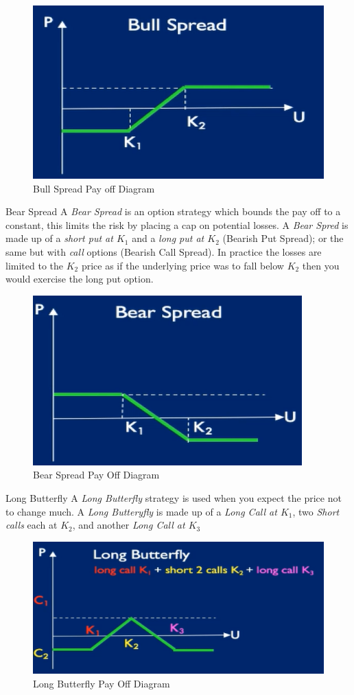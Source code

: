 \documentclass[11pt,a4paper]{article}
\begin{document}
  \begin{figure}[ht!]
    \centering
    \includegraphics[width=.5\textwidth]{bullSpread.PNG}
    \caption{Bull Spread Pay off Diagram}
  \end{figure}

  \begin{definition}{Bear Spread}
    A \textit{Bear Spread} is an option strategy which bounds the pay off to a constant, this limits the risk by placing a cap on potential losses. A \textit{Bear Spred} is made up of a \textit{short put at $K_1$} and a \textit{long put at $K_2$} (Bearish Put Spread); or the same but with \textit{call} options (Bearish Call Spread). In practice the losses are limited to the $K_2$ price as if the underlying price was to fall below $K_2$ then you would exercise the long put option.
  \end{definition}

  \begin{figure}[ht!]
    \centering
    \includegraphics[width=.5\textwidth]{bearSpread.PNG}
    \caption{Bear Spread Pay Off Diagram}
  \end{figure}

  \begin{definition}{Long Butterfly}
    A \textit{Long Butterfly} strategy is used when you expect the price not to change much. A \textit{Long Butteryfly} is made up of a \textit{Long Call at $K_1$}, two \textit{Short calls} each at $K_2$, and another \textit{Long Call at $K_3$}
  \end{definition}

  \begin{figure}[ht!]
    \centering
    \includegraphics[width=.5\textwidth]{longButterfly.PNG}
    \caption{Long Butterfly Pay Off Diagram}
  \end{figure}
\end{document}
